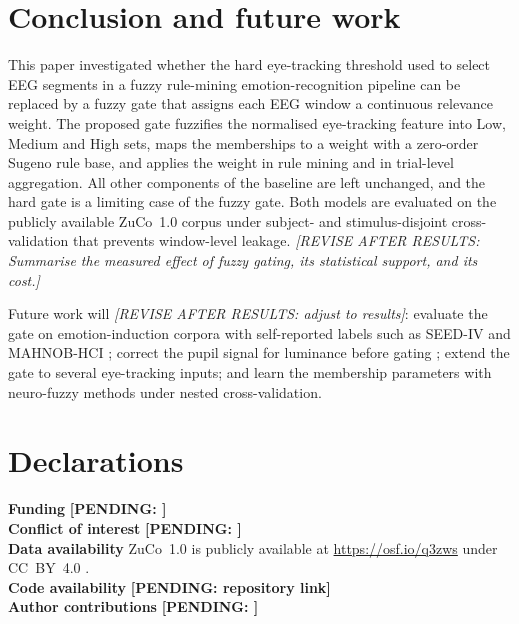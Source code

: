 \documentclass[11pt,a4paper]{article}
\newcommand{\pending}[1]{\textcolor{red!75!black}{\textbf{[PENDING: #1]}}}
\newcommand{\revise}[1]{\textcolor{orange!80!black}{\textit{[REVISE AFTER RESULTS: #1]}}}
\newcommand{\dataset}{ZuCo~1.0}
\begin{document}
\section{Conclusion and future work}
\label{sec:conclusion}
This paper investigated whether the hard eye-tracking threshold used to select EEG segments in a fuzzy rule-mining emotion-recognition pipeline can be replaced by a fuzzy gate that assigns each EEG window a continuous relevance weight. The proposed gate fuzzifies the normalised eye-tracking feature into Low, Medium and High sets, maps the memberships to a weight with a zero-order Sugeno rule base, and applies the weight in rule mining and in trial-level aggregation. All other components of the baseline are left unchanged, and the hard gate is a limiting case of the fuzzy gate. Both models are evaluated on the publicly available \dataset{} corpus under subject- and stimulus-disjoint cross-validation that prevents window-level leakage. \revise{Summarise the measured effect of fuzzy gating, its statistical support, and its cost.}

Future work will \revise{adjust to results}: evaluate the gate on emotion-induction corpora with self-reported labels such as SEED-IV \cite{Zheng2019} and MAHNOB-HCI \cite{Soleymani2012db}; correct the pupil signal for luminance before gating \cite{Raiturkar2016}; extend the gate to several eye-tracking inputs; and learn the membership parameters with neuro-fuzzy methods \cite{Jang1993} under nested cross-validation.

\section*{Declarations}
\noindent\textbf{Funding} \pending{}\\
\textbf{Conflict of interest} \pending{}\\
\textbf{Data availability} ZuCo~1.0 is publicly available at \url{https://osf.io/q3zws} under CC~BY~4.0 \cite{Hollenstein2018}.\\
\textbf{Code availability} \pending{repository link}\\
\textbf{Author contributions} \pending{}
\end{document}
